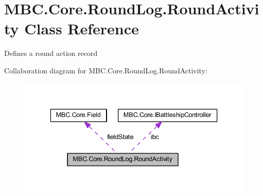 \hypertarget{class_m_b_c_1_1_core_1_1_round_log_1_1_round_activity}{\section{M\-B\-C.\-Core.\-Round\-Log.\-Round\-Activity Class Reference}
\label{class_m_b_c_1_1_core_1_1_round_log_1_1_round_activity}
}


Defines a round action record 




Collaboration diagram for M\-B\-C.\-Core.\-Round\-Log.\-Round\-Activity\-:\nopagebreak
\begin{figure}[H]
\begin{center}
\leavevmode
\includegraphics[width=336pt]{class_m_b_c_1_1_core_1_1_round_log_1_1_round_activity__coll__graph}
\end{center}
\end{figure}
